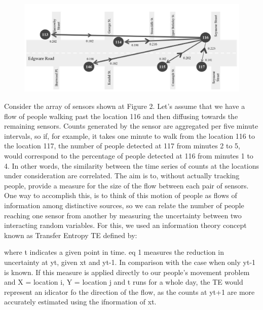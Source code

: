 \begin{figure}
  \forceversofloat
  \includegraphics[trim={0 0 0 0},clip]{images/applications-transfer-entropy.png}
  \caption{}
  \label{}
\end{figure}

Consider the array of sensors shown at Figure 2. Let’s assume that we have a flow of people walking past the location 116 and then diffusing towards the remaining sensors. Counts generated by the sensor are aggregated per five minute intervals, so if, for example, it takes one minute to walk from the location 116 to the location 117, the number of people detected at 117 from minutes 2 to 5, would correspond to the percentage of people detected at 116 from minutes 1 to 4. In other words, the similarity between the time series of counts at the locations under consideration are correlated. The aim is to, without actually tracking people, provide a measure for the size of the flow between each pair of sensors.  One way to accomplish this, is to think of this motion of people as flows of information among distinctive sources, so we can relate the number of people reaching one sensor from another by measuring the uncertainty between two interacting random variables. For this, we used an information theory concept known as Transfer Entropy TE defined by:

where t indicates a given point in time. eq 1 measures the reduction in uncertainty at yt, given xt and yt-1. In comparison with the case when only yt-1 is known.
If this measure is applied directly to our people's movement problem and X = location i, Y = location j and t runs for a whole day, the TE would represent an idicator fo the direction of the flow, as the counts at yt+1 are more accurately estimated using the ifnormation of xt.


